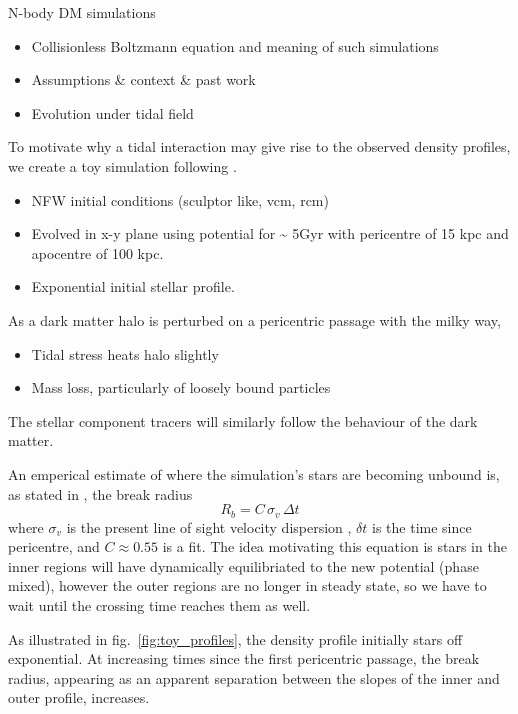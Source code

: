 N-body DM simulations

\begin{itemize}
\tightlist
\item
  Collisionless Boltzmann equation and meaning of such simulations
\item
  Assumptions \& context \& past work
\item
  Evolution under tidal field
\end{itemize}

To motivate why a tidal interaction may give rise to the observed
density profiles, we create a toy simulation following \citet{PNM2008}.

\begin{itemize}
\item
  NFW initial conditions (sculptor like, vcm, rcm)
\item
  Evolved in x-y plane using \citet{EP2020} potential for
  \textasciitilde{} 5Gyr with pericentre of 15 kpc and apocentre of 100
  kpc.
\item
  Exponential initial stellar profile.
\end{itemize}

As a dark matter halo is perturbed on a pericentric passage with the
milky way,

\begin{itemize}
\tightlist
\item
  Tidal stress heats halo slightly
\item
  Mass loss, particularly of loosely bound particles
\end{itemize}

The stellar component tracers will similarly follow the behaviour of the
dark matter.

An emperical estimate of where the simulation's stars are becoming
unbound is, as stated in \citet{PNM2008}, the break radius
\begin{equation}
R_b = C\,\sigma_{v}\,\Delta t
\end{equation} where \(\sigma_v\) is the present line of sight velocity
dispersion , \(\delta t\) is the time since pericentre, and
\(C \approx 0.55\) is a fit. The idea motivating this equation is stars
in the inner regions will have dynamically equilibriated to the new
potential (phase mixed), however the outer regions are no longer in
steady state, so we have to wait until the crossing time reaches them as
well.

As illustrated in fig.~\ref{fig:toy_profiles}, the density profile
initially stars off exponential. At increasing times since the first
pericentric passage, the break radius, appearing as an apparent
separation between the slopes of the inner and outer profile, increases.

